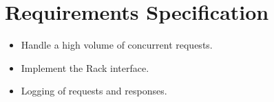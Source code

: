 \section{Requirements Specification}

\begin{itemize}
  \item Handle a high volume of concurrent requests.
  \item Implement the Rack interface.
  \item Logging of requests and responses.
\end{itemize}
